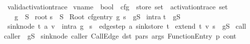 \begin{isabelle}
\ valid\isacharunderscore{}activation\isacharunderscore{}trace\ \isacharcolon{}\isacharcolon{}\isanewline
\isaindent{\ \ \ \ }\isachardoublequote{}\isacharparenleft{}vname\ {\isasymRightarrow}\ bool\isacharparenright{}\ {\isasymRightarrow}\ cfg\ {\isasymRightarrow}\ store\ set\ {\isasymRightarrow}\ activation\isacharunderscore{}trace\ set\isachardoublequote{}\isanewline
\isaindent{\ \ \ \ }\isacharparenleft{}\isachardoublequote{}{\isasymT}\isactrlbsub \isacharunderscore{}\isacharcomma{}\isacharunderscore{}\isacharcomma{}\isacharunderscore{}\isactrlesub{}\isachardoublequote{}\isacharparenright{}\isanewline
\isaindent{\ \ }\ {\isasymG}\ \ g\ \ S\ \isanewline
\isaindent{\ \ }root\isacharcolon{}\isanewline
\isaindent{\ \ \ \ }\isachardoublequote{}s\ {\isasymin}\ S\isanewline
\isaindent{\ \ \ \ \ }{\isasymLongrightarrow}\ Root\ \isacharbrackleft{}\isacharparenleft{}cfg\isacharunderscore{}entry\ g\isacharcomma{}\ s\isacharparenright{}\isacharbrackright{}\ {\isasymin}\ {\isasymT}\isactrlbsub {\isasymG}\isacharcomma{}g\isacharcomma{}S\isactrlesub{}\isachardoublequote{}\isanewline
\isacharbar{}\ intra\isacharcolon{}\isanewline
\isaindent{\ \ \ \ }\isachardoublequote{}t\ {\isasymin}\ {\isasymT}\isactrlbsub {\isasymG}\isacharcomma{}g\isacharcomma{}S\isactrlesub{}\isanewline
\isaindent{\ \ \ \ \ }{\isasymLongrightarrow}\ \isacharparenleft{}sink\isacharunderscore{}node\ t\isacharcomma{}\ a\isacharcomma{}\ v\isacharparenright{}\ {\isasymin}\ intra\ g\isanewline
\isaindent{\ \ \ \ \ }{\isasymLongrightarrow}\ s\isacharprime{}\ {\isasymin}\ edge\isacharunderscore{}step\ a\ \isacharparenleft{}sink\isacharunderscore{}store\ t\isacharparenright{}\isanewline
\isaindent{\ \ \ \ \ }{\isasymLongrightarrow}\ extend\ t\ \isacharparenleft{}v\isacharcomma{}\ s\isacharprime{}\isacharparenright{}\ {\isasymin}\ {\isasymT}\isactrlbsub {\isasymG}\isacharcomma{}g\isacharcomma{}S\isactrlesub{}\isachardoublequote{}\isanewline
\isacharbar{}\ call\isacharcolon{}\isanewline
\isaindent{\ \ \ \ }\isachardoublequote{}caller\ {\isasymin}\ {\isasymT}\isactrlbsub {\isasymG}\isacharcomma{}g\isacharcomma{}S\isactrlesub{}\isanewline
\isaindent{\ \ \ \ \ }{\isasymLongrightarrow}\ \isacharparenleft{}sink\isacharunderscore{}node\ caller\isacharcomma{}\ CallEdge\ dst\ pars\ args\isacharcomma{}\ FunctionEntry\ p\isacharcomma{}\ cont\isacharparenright{}\isanewline

\end{isabelle}
